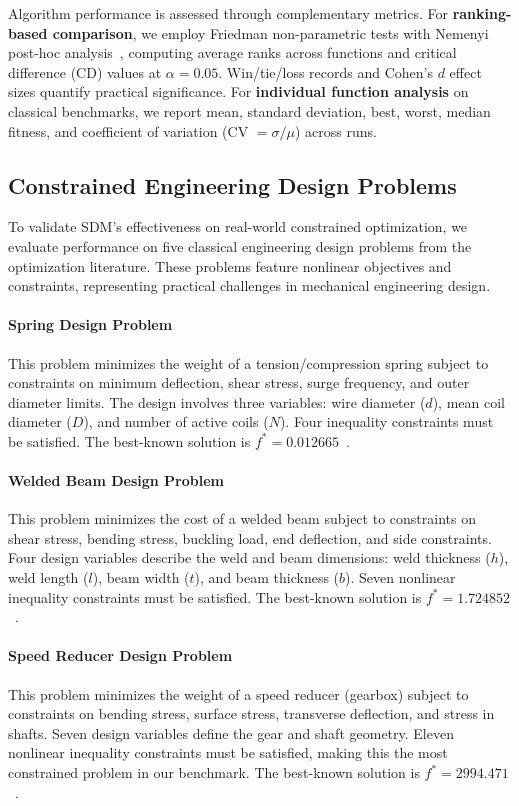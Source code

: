 \documentclass[11pt]{article}
\begin{document}
Algorithm performance is assessed through complementary metrics. For \textbf{ranking-based comparison}, we employ Friedman non-parametric tests with Nemenyi post-hoc analysis~\citep{derrac2011practical}, computing average ranks across functions and critical difference (CD) values at $\alpha = 0.05$. Win/tie/loss records and Cohen's $d$ effect sizes quantify practical significance. For \textbf{individual function analysis} on classical benchmarks, we report mean, standard deviation, best, worst, median fitness, and coefficient of variation (CV $= \sigma / \mu$) across runs.

\subsection{Constrained Engineering Design Problems}
\label{sec:engineering_problems}

To validate SDM's effectiveness on real-world constrained optimization, we evaluate performance on five classical engineering design problems from the optimization literature. These problems feature nonlinear objectives and constraints, representing practical challenges in mechanical engineering design.

\paragraph{Spring Design Problem} This problem minimizes the weight of a tension/compression spring subject to constraints on minimum deflection, shear stress, surge frequency, and outer diameter limits. The design involves three variables: wire diameter ($d$), mean coil diameter ($D$), and number of active coils ($N$). Four inequality constraints must be satisfied. The best-known solution is $f^* = 0.012665$~\citep{coello2000use}.

\paragraph{Welded Beam Design Problem} This problem minimizes the cost of a welded beam subject to constraints on shear stress, bending stress, buckling load, end deflection, and side constraints. Four design variables describe the weld and beam dimensions: weld thickness ($h$), weld length ($l$), beam width ($t$), and beam thickness ($b$). Seven nonlinear inequality constraints must be satisfied. The best-known solution is $f^* = 1.724852$~\citep{ragsdell1976optimal}.

\paragraph{Speed Reducer Design Problem} This problem minimizes the weight of a speed reducer (gearbox) subject to constraints on bending stress, surface stress, transverse deflection, and stress in shafts. Seven design variables define the gear and shaft geometry. Eleven nonlinear inequality constraints must be satisfied, making this the most constrained problem in our benchmark. The best-known solution is $f^* = 2994.471$~\citep{golinski1970optimal}.
\end{document}
